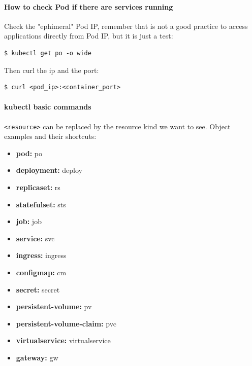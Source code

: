 \documentclass{article}
\newenvironment{blocktemplate}[1]{%
    \tcolorbox[beamer,%
    noparskip,breakable,
    colframe=Blue,%
    colbacklower=LimeGreen!75!LightGreen,%
    title=#1]}%
    {\endtcolorbox}
\newenvironment{codetemplate}[1][]{%
  \mybasecolorbox[#1]
  \itshape
}{%
  \endmybasecolorbox
}
\begin{document}
\paragraph{How to check Pod if there are services running}
Check the "ephimeral" Pod IP, remember that is not a good practice to access applications directly from Pod IP, but it is just a test:
\begin{codetemplate}{}
\begin{verbatim}
$ kubectl get po -o wide
\end{verbatim}
\end{codetemplate}

Then curl the ip and the port:
\begin{codetemplate}{}
\begin{verbatim}
$ curl <pod_ip>:<container_port>
\end{verbatim}
\end{codetemplate}

\paragraph{kubectl basic commands}

\begin{blocktemplate}{What is resource?}
\verb|<resource>| can be replaced by the resource kind we want to see. Object examples and their shortcuts:
\begin{itemize}
    \item \textbf{pod:} po
    \item \textbf{deployment:} deploy
    \item \textbf{replicaset:} rs
    \item \textbf{statefulset:} sts
    \item \textbf{job:} job
    \item \textbf{service:} svc
    \item \textbf{ingress:} ingress
    \item \textbf{configmap:} cm
    \item \textbf{secret:} secret
    \item \textbf{persistent-volume:} pv
    \item \textbf{persistent-volume-claim:} pvc
    \item \textbf{virtualservice:} virtualservice
    \item \textbf{gateway:} gw
\end{itemize}
\end{blocktemplate}
\end{document}
